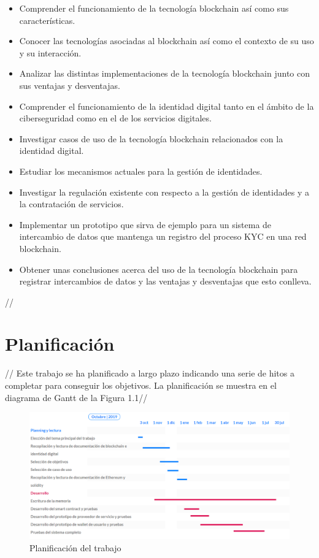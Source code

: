 \documentclass[12pt]{report}
\begin{document}
\begin{itemize}
\item Comprender el funcionamiento de la tecnología blockchain así como sus características.

\item Conocer las tecnologías asociadas al blockchain así como el contexto de su uso y su interacción.

\item Analizar las distintas implementaciones de la tecnología blockchain junto con sus ventajas y desventajas.

\item Comprender el funcionamiento de la identidad digital tanto en el ámbito de la ciberseguridad como en el de los servicios digitales.

\item Investigar casos de uso de la tecnología blockchain relacionados con la identidad digital.

\item Estudiar los mecanismos actuales para la gestión de identidades.

\item Investigar la regulación existente con respecto a la gestión de identidades y a la contratación de servicios.

\item Implementar un prototipo que sirva de ejemplo para un sistema de intercambio de datos que mantenga un registro del proceso KYC en una red blockchain.

\item Obtener unas conclusiones acerca del uso de la tecnología blockchain para registrar intercambios de datos y las ventajas y desventajas que esto conlleva.

\end{itemize}
//
\section{Planificación}
//
Este trabajo se ha planificado a largo plazo indicando una serie de hitos a completar para conseguir los objetivos. La planificación se muestra en el diagrama de Gantt de la Figura 1.1//
\begin{figure}[H]
\includegraphics[width=1\textwidth]{Planning}
\caption{Planificación del trabajo}
\end{figure}
\end{document}
